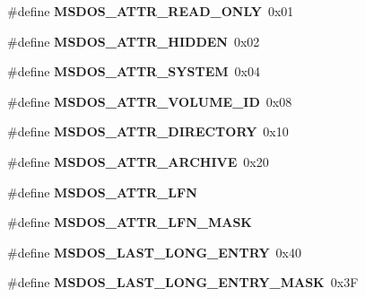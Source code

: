 \begin{DoxyCompactItemize}
\item 
\mbox{\label{group__libfs__msdos_ga1da79f8ab9a85f4c7ee130eac7ee9339}} 
\#define {\bfseries M\+S\+D\+O\+S\+\_\+\+A\+T\+T\+R\+\_\+\+R\+E\+A\+D\+\_\+\+O\+N\+LY}~0x01
\item 
\mbox{\label{group__libfs__msdos_ga3f236cf0b63e3f0d300daf6ea3bc688d}} 
\#define {\bfseries M\+S\+D\+O\+S\+\_\+\+A\+T\+T\+R\+\_\+\+H\+I\+D\+D\+EN}~0x02
\item 
\mbox{\label{group__libfs__msdos_ga8db299c188ab86a1c535efcafbb89099}} 
\#define {\bfseries M\+S\+D\+O\+S\+\_\+\+A\+T\+T\+R\+\_\+\+S\+Y\+S\+T\+EM}~0x04
\item 
\mbox{\label{group__libfs__msdos_gae15ea95134a2db037278a29dd4f962f4}} 
\#define {\bfseries M\+S\+D\+O\+S\+\_\+\+A\+T\+T\+R\+\_\+\+V\+O\+L\+U\+M\+E\+\_\+\+ID}~0x08
\item 
\mbox{\label{group__libfs__msdos_ga951d651838347595cd0cf6784cc7eca8}} 
\#define {\bfseries M\+S\+D\+O\+S\+\_\+\+A\+T\+T\+R\+\_\+\+D\+I\+R\+E\+C\+T\+O\+RY}~0x10
\item 
\mbox{\label{group__libfs__msdos_gaea6c651350da91f1112f9ef472eba5af}} 
\#define {\bfseries M\+S\+D\+O\+S\+\_\+\+A\+T\+T\+R\+\_\+\+A\+R\+C\+H\+I\+VE}~0x20
\item 
\#define {\bfseries M\+S\+D\+O\+S\+\_\+\+A\+T\+T\+R\+\_\+\+L\+FN}
\item 
\#define {\bfseries M\+S\+D\+O\+S\+\_\+\+A\+T\+T\+R\+\_\+\+L\+F\+N\+\_\+\+M\+A\+SK}
\item 
\mbox{\label{group__libfs__msdos_ga5f7c7d1fa3066889d4f23b799a3a5d31}} 
\#define {\bfseries M\+S\+D\+O\+S\+\_\+\+L\+A\+S\+T\+\_\+\+L\+O\+N\+G\+\_\+\+E\+N\+T\+RY}~0x40
\item 
\mbox{\label{group__libfs__msdos_gabbceae9e95096950a6c7c88212565651}} 
\#define {\bfseries M\+S\+D\+O\+S\+\_\+\+L\+A\+S\+T\+\_\+\+L\+O\+N\+G\+\_\+\+E\+N\+T\+R\+Y\+\_\+\+M\+A\+SK}~0x3F
\item 
\mbox{\label{group__libfs__msdos_gad5988938352b7d2c787f3577fcb6df61}} 

\end{DoxyCompactItemize}
